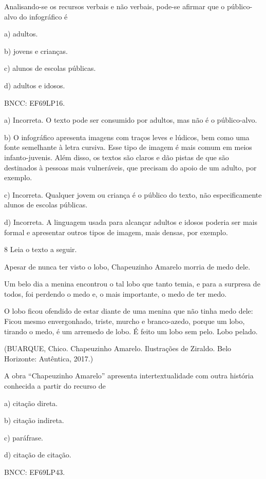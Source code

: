 
Analisando-se os recursos verbais e não verbais, pode-se afirmar que o
público-alvo do infográfico é

a) adultos.

b) jovens e crianças.

c) alunos de escolas públicas.

d) adultos e idosos.

BNCC: EF69LP16.

a) Incorreta. O texto pode ser consumido por adultos, mas não é o
público-alvo.

b) O infográfico apresenta imagens com traços leves e lúdicos, bem como
uma fonte semelhante à letra cursiva. Esse tipo de imagem é mais comum
em meios infanto-juvenis. Além disso, os textos são claros e dão pistas
de que são destinados à pessoas mais vulneráveis, que precisam do apoio
de um adulto, por exemplo.

c) Incorreta. Qualquer jovem ou criança é o público do texto, não
especificamente alunos de escolas públicas.

d) Incorreta. A linguagem usada para alcançar adultos e idosos poderia
ser mais formal e apresentar outros tipos de imagem, mais densas, por
exemplo.

\num{8} Leia o texto a seguir.

Apesar de nunca ter visto o lobo, Chapeuzinho Amarelo morria de medo
dele.

Um belo dia a menina encontrou o tal lobo que tanto temia, e para a
surpresa de todos, foi perdendo o medo e, o mais importante, o medo de
ter medo.

O lobo ficou ofendido de estar diante de uma menina que não tinha medo
dele: Ficou mesmo envergonhado, triste, murcho e branco-azedo, porque um
lobo, tirando o medo, é um arremedo de lobo. É feito um lobo sem pelo.
Lobo pelado.

(BUARQUE, Chico. Chapeuzinho Amarelo. Ilustrações de Ziraldo. Belo
Horizonte: Autêntica, 2017.)

A obra ``Chapeuzinho Amarelo'' apresenta intertextualidade com outra
história conhecida a partir do recurso de

a) citação direta.

b) citação indireta.

c) paráfrase.

d) citação de citação.

BNCC: EF69LP43.

